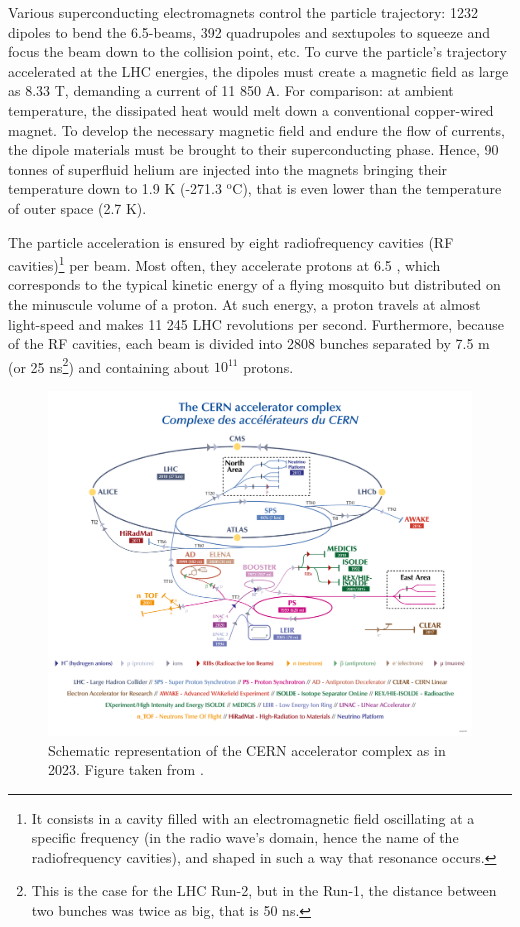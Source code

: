 Various superconducting electromagnets control the particle trajectory: 1232 dipoles to bend the 6.5-\tev beams, 392 quadrupoles and sextupoles to squeeze and focus the beam down to the collision point, etc. To curve the particle's trajectory accelerated at the LHC energies, the dipoles must create a magnetic field as large as 8.33 T, demanding a current of 11 850 A. For comparison: at ambient temperature, the dissipated heat would melt down a conventional copper-wired magnet. To develop the necessary magnetic field and endure the flow of currents, the dipole materials must be brought to their superconducting phase. Hence, 90 tonnes of superfluid helium are injected into the magnets bringing their temperature down to 1.9 K (-271.3 $^\text{o}$C), that is even lower than the temperature of outer space (2.7 K). 

The particle acceleration is ensured by eight radiofrequency cavities (RF cavities)\footnote{It consists in a cavity filled with an electromagnetic field oscillating at a specific frequency (in the radio wave's domain, hence the name of the radiofrequency cavities), and shaped in such a way that resonance occurs.} per beam. Most often, they accelerate protons at 6.5 \tev, which corresponds to the typical kinetic energy of a flying mosquito but distributed on the minuscule volume of a proton. At such energy, a proton travels at almost light-speed and makes 11 245 LHC revolutions per second. Furthermore, because of the RF cavities, each beam is divided into 2808 bunches separated by 7.5 m (or 25 ns\footnote{This is the case for the LHC Run-2, but in the Run-1, the distance between two bunches was twice as big, that is 50 ns.}) and containing about $10^{11}$ protons. \\

\begin{figure}[t]
	\centering
	\includegraphics[width=1\textwidth]{Figs/Chapter3/CCC-v2022_Large.png}
	\caption{Schematic representation of the CERN accelerator complex as in 2023. Figure taken from \cite{lopienskaewaCERNAcceleratorComplex2022}.}
	\label{fig:AcceleratorComplex}
\end{figure}

